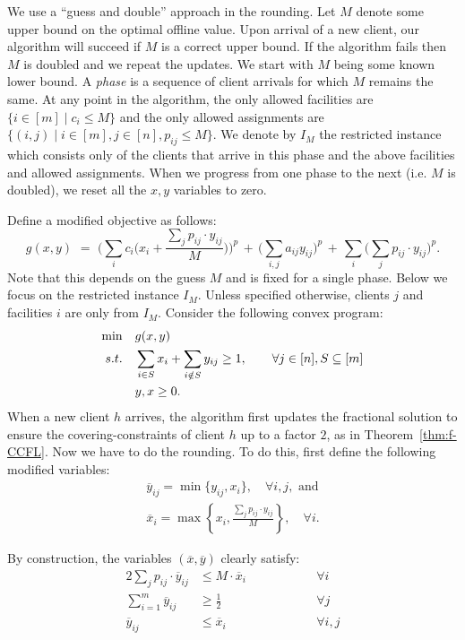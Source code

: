 \documentclass[letterpaper,11pt]{article}
\newcommand{\ox}{\ensuremath{\overline{x}}\xspace}
\newcommand{\oy}{\ensuremath{\overline{y}}\xspace}
\def\oy{\overline{y}}
\def\ox{\overline{x}}
\begin{document}
We use a ``guess and double'' approach in the rounding. Let $M$ denote
some upper bound on the optimal offline value. Upon arrival of a new
client, our algorithm will succeed if $M$ is a correct upper bound. If
the algorithm fails then $M$ is doubled and we repeat the updates. We
start with $M$ being some known lower bound. A {\em phase} is a sequence
of client arrivals for which $M$ remains the same. At any point in the
algorithm, the only allowed facilities are $\{i \in [m] \mid c_i\le
M\}$ and the only allowed assignments are $\{ (i,j) \mid i \in [m],
j\in[n], p_{ij}\le M\}$. We denote by $I_M$ the restricted instance
which consists only of the clients that arrive in this phase and the
above facilities and allowed assignments. When we progress from one
phase to the next (i.e. $M$ is doubled), we reset all the $x,y$
variables to zero.

Define a modified objective as follows:
$$g(x,y) \,\,=\,\, \bigg(\sum_{i}^{}c_i \bigg(x_i + \frac{\sum_j p_{ij} \cdot y_{ij}}{M}\bigg)\bigg)^p \,+\, \bigg( \sum_{i,j}a_{ij}y_{ij}\bigg)^p \, + \,  \sum_{i}^{}\bigg(\sum_{j}^{ }p_{ij} \cdot y_{ij}\bigg)^p.$$
Note that this depends on the guess $M$ and is fixed for a single
phase. Below we focus on the restricted instance $I_M$. Unless specified
otherwise, clients $j$ and facilities $i$ are only from $I_M$. Consider
the following convex program:
\begin{align}
  \min & \quad g(x,y) \label{eq:gLP} \\
  s.t. & \quad \sum_{i\in S} x_i + \sum_{i\notin S}y_{ij} \geq 1, \qquad
  \forall j\in [n], S \subseteq [m] \notag\\
  &\quad y, x \geq 0. \notag
\end{align}
When a new client $h$ arrives, the algorithm first updates the
fractional solution to ensure the covering-constraints of client $h$ up
to a factor $2$, as in Theorem~\ref{thm:f-CCFL}. Now we have to do the
rounding. To do this, first define the following modified variables:
\begin{gather*}
\overline{y}_{ij}=\min\{y_{ij},x_i\}, \quad \forall i,j, \text{ and} \\
\ox_i = \max\left\{ x_i, \frac{\sum_j p_{ij} \cdot y_{ij}}{M} \right\},\quad \forall i.
\end{gather*}

By construction, the variables $(\ox,\oy)$ clearly satisfy:
\begin{alignat}{2}
  \textstyle \sum_j p_{ij}\cdot \oy_{ij} &\le M\cdot \ox_i & \qquad\qquad &\forall
  i \label{eq:ccfl:1} \\
  \textstyle \sum_{i=1}^m \oy_{ij} &\ge \frac12    &  &\forall j
  \label{eq:ccfl:2} \\
  \oy_{ij} &\le \ox_i &  &\forall i, j
  \label{eq:ccfl:3}
\end{alignat}
\end{document}
